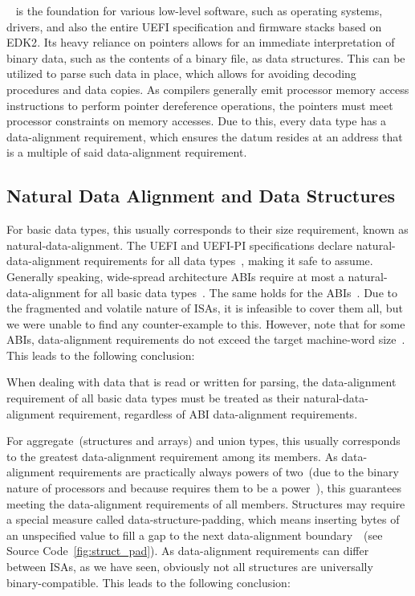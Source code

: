 ~\cite{ISO:2018:III} is the foundation for various low-level software, such as operating systems, drivers, and also the entire \gls{UEFI} specification and \gls{firmware} stacks based on \gls{EDK2}. Its heavy reliance on pointers allows for an immediate interpretation of binary data, such as the contents of a binary file, as data structures. This can be utilized to parse such data in place, which allows for avoiding decoding procedures and data copies. As compilers generally emit processor memory access instructions to perform pointer dereference operations, the pointers must meet processor constraints on memory accesses. Due to this, every  data type has a \gls{data-alignment} requirement, which ensures the datum resides at an address that is a multiple of said \gls{data-alignment} requirement.

\subsection{Natural Data Alignment and Data Structures}

For basic data types, this usually corresponds to their size requirement, known as \gls{natural-data-alignment}. The \gls{UEFI} and \gls{UEFI-PI} specifications declare \gls{natural-data-alignment} requirements for all data types~\cite{pi-spec,uefi-spec}, making it safe to assume. Generally speaking, wide-spread  architecture \glspl{ABI} require at most a \gls{natural-data-alignment} for all basic data types~\cite{agner-x86-cc}. The same holds for the  \glspl{ABI}~\cite{arm32-pcs,arm64-pcs}. Due to the fragmented and volatile nature of \glspl{ISA}, it is infeasible to cover them all, but we were unable to find any counter-example to this. However, note that for some \glspl{ABI}, \gls{data-alignment} requirements do not exceed the target \gls{machine-word} size~\cite{sysVi386,arm32-pcs}. This leads to the following conclusion:

\begin{requirement}
  When dealing with data that is read or written for parsing, the \gls{data-alignment} requirement of all basic data types must be treated as their \gls{natural-data-alignment} requirement, regardless of \gls{ABI} \gls{data-alignment} requirements.
\end{requirement}

For aggregate~(structures and arrays) and union types, this usually corresponds to the greatest \gls{data-alignment} requirement among its members. As \gls{data-alignment} requirements are practically always powers of two~(due to the binary nature of processors and because  requires them to be a power~\cite{ISO:2018:III}), this guarantees meeting the \gls{data-alignment} requirements of all members. Structures may require a special measure called \gls{data-structure-padding}, which means inserting \glspl{byte} of an unspecified value to fill a gap to the next \gls{data-alignment} boundary~\cite{ISO:2018:III}~(see Source Code~\ref{fig:struct_pad}). As \gls{data-alignment} requirements can differ between \glspl{ISA}, as we have seen, obviously not all structures are universally binary-compatible. This leads to the following conclusion:


